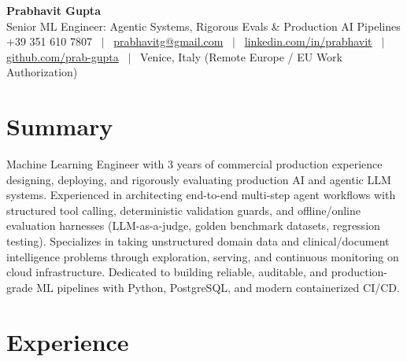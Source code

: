 \documentclass[a4paper,10pt]{article}
\begin{document}
\begin{minipage}[c]{0.80\textwidth}
 {\Huge\bfseries Prabhavit Gupta}\\[3pt]
 {\color{accent}\large Senior ML Engineer: Agentic Systems, Rigorous Evals \& Production AI Pipelines}\\[6pt]
 {\footnotesize +39 351 610 7807 ~$\vert$~
 \href{mailto:prabhavitg@gmail.com}{prabhavitg@gmail.com} ~$\vert$~
 \href{https://www.linkedin.com/in/prabhavit/}{linkedin.com/in/prabhavit} ~$\vert$~
 \href{https://github.com/prab-gupta}{github.com/prab-gupta} ~$\vert$~
 Venice, Italy (Remote Europe / EU Work Authorization)}
\end{minipage}\hfill

\section{Summary}
Machine Learning Engineer with 3 years of commercial production experience designing, deploying, and rigorously evaluating production AI and agentic LLM systems. Experienced in architecting end-to-end multi-step agent workflows with structured tool calling, deterministic validation guards, and offline/online evaluation harnesses (LLM-as-a-judge, golden benchmark datasets, regression testing). Specializes in taking unstructured domain data and clinical/document intelligence problems through exploration, serving, and continuous monitoring on cloud infrastructure. Dedicated to building reliable, auditable, and production-grade ML pipelines with Python, PostgreSQL, and modern containerized CI/CD.

\section{Experience}
\end{document}
